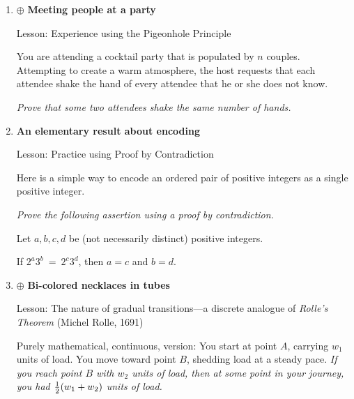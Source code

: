 \begin{enumerate}
\begin{enumerate}
{The basis case of the induction is for $k=1$
*********}
  \end{enumerate}


\medskip\item
$\oplus$
{\bf Meeting people at a party}

{\sc Lesson:} Experience using the Pigeonhole Principle

\smallskip

You are attending a cocktail party that is populated by $n$ couples.  Attempting to create a warm atmosphere, the host requests that each attendee shake the hand of every attendee that he or she does not know.

\smallskip

{\em Prove that some two attendees shake the same number of hands.}
\medskip

\medskip\item
{\bf An elementary result about encoding}

{\sc Lesson:} Practice using Proof by Contradiction

\smallskip

Here is a simple way to encode an ordered pair of positive integers as a single positive integer.

\smallskip

{\em Prove the following assertion using a proof by contradiction.}

\begin{prop}
Let $a, b, c, d$ be (not necessarily distinct) positive integers.

If $2^a 3^b \ = \ 2^c 3^d$, then $a=c$ and $b=d$.
\end{prop}

\medskip\item
$\oplus$
{\bf Bi-colored necklaces in tubes}

 

{\sc Lesson:} The nature of gradual transitions---a discrete analogue of {\em Rolle's Theorem} {\small (Michel Rolle, 1691)}

\smallskip

{\small\sf Purely mathematical, continuous, version}:
You start at point $A$, carrying $w_1$ units of load. You move toward point $B$, shedding load at a steady pace.  {\em If you reach point $B$ with $w_2$ units of load, then at some point in your journey, you had ${1 \over 2} (w_1 + w_2)$ units of load.}

\smallskip


\end{enumerate}
